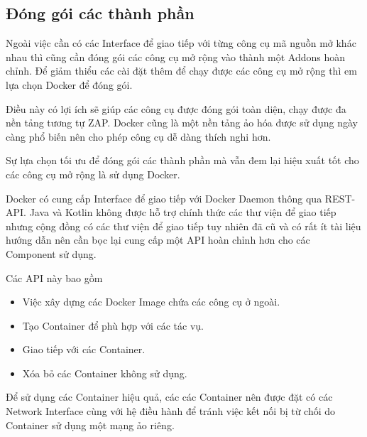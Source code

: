 \documentclass[./../main.tex]{subfiles}
\begin{document}
\subsection{Đóng gói các thành phần}

Ngoài việc cần có các Interface để giao tiếp với từng công cụ mã nguồn mở khác nhau thì cũng cần đóng gói các công cụ mở rộng vào thành một Addons hoàn chỉnh. Để giảm thiểu các cài đặt thêm để chạy được các công cụ mở rộng thì em lựa chọn Docker để đóng gói.

Điều này có lợi ích sẽ giúp các công cụ được đóng gói toàn diện, chạy được đa nền tảng tương tự ZAP. Docker cũng là một nền tảng ảo hóa được sử dụng ngày càng phổ biến nên cho phép công cụ dễ dàng thích nghi hơn.

Sự lựa chọn tối ưu để đóng gói các thành phần mà vẫn đem lại hiệu xuất tốt cho các công cụ mở rộng là sử dụng Docker.

Docker có cung cấp Interface để giao tiếp với Docker Daemon thông qua REST-API. Java và Kotlin không được hỗ trợ chính thức các thư viện để giao tiếp nhưng cộng đồng có các thư viện để giao tiếp tuy nhiên đã cũ và có rất ít tài liệu hướng dẫn nên cần bọc lại cung cấp một API hoàn chỉnh hơn cho các Component sử dụng.

Các API này bao gồm
\begin{itemize}
	\item Việc xây dựng các Docker Image chứa các công cụ ở ngoài.
	\item Tạo Container để phù hợp với các tác vụ.
	\item Giao tiếp với các Container.
	\item Xóa bỏ các Container không sử dụng.
\end{itemize}

Để sử dụng các Container hiệu quả, các các Container nên được đặt có các Network Interface cùng với hệ điều hành để tránh việc kết nối bị từ chối do Container sử dụng một mạng ảo riêng.
\end{document}
